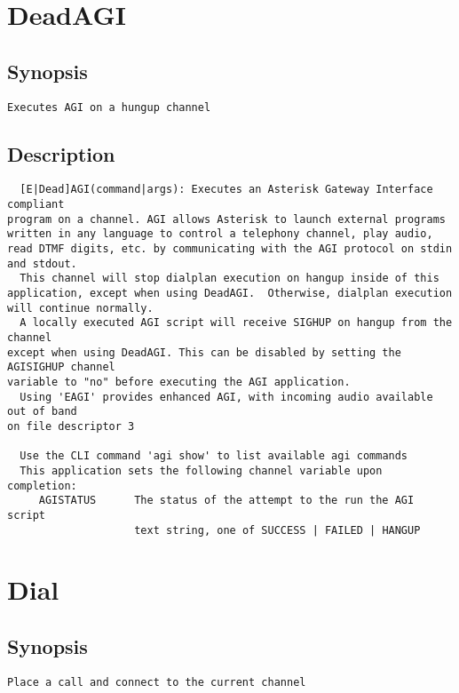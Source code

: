 \section{DeadAGI}
\subsection{Synopsis}
\begin{verbatim}
Executes AGI on a hungup channel
\end{verbatim}
\subsection{Description}
\begin{verbatim}
  [E|Dead]AGI(command|args): Executes an Asterisk Gateway Interface compliant
program on a channel. AGI allows Asterisk to launch external programs
written in any language to control a telephony channel, play audio,
read DTMF digits, etc. by communicating with the AGI protocol on stdin
and stdout.
  This channel will stop dialplan execution on hangup inside of this
application, except when using DeadAGI.  Otherwise, dialplan execution
will continue normally.
  A locally executed AGI script will receive SIGHUP on hangup from the channel
except when using DeadAGI. This can be disabled by setting the AGISIGHUP channel
variable to "no" before executing the AGI application.
  Using 'EAGI' provides enhanced AGI, with incoming audio available out of band
on file descriptor 3

  Use the CLI command 'agi show' to list available agi commands
  This application sets the following channel variable upon completion:
     AGISTATUS      The status of the attempt to the run the AGI script
                    text string, one of SUCCESS | FAILED | HANGUP

\end{verbatim}


\section{Dial}
\subsection{Synopsis}
\begin{verbatim}
Place a call and connect to the current channel
\end{verbatim}
